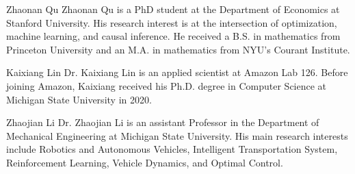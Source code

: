 \documentclass[journal]{IEEEtran}
\begin{document}

%









% 
\newpage

%




  
\newpage
\begin{IEEEbiography}{Zhaonan Qu}
Zhaonan Qu is a PhD student at the Department of Economics at Stanford University. His research interest is at the intersection of optimization, machine learning, and causal inference. He received a B.S. in mathematics from Princeton University and an M.A. in mathematics from NYU's Courant Institute.
\end{IEEEbiography}

\begin{IEEEbiography}{Kaixiang Lin}
Dr. Kaixiang Lin is an applied scientist at Amazon Lab 126. Before joining Amazon, 
Kaixiang received his Ph.D. degree in Computer Science at Michigan State University in 2020. 
\end{IEEEbiography}





\begin{IEEEbiography}{Zhaojian Li}
Dr. Zhaojian Li is an assistant Professor in the Department of Mechanical Engineering at Michigan State University. His main research interests include Robotics and Autonomous Vehicles, Intelligent Transportation System, Reinforcement Learning, Vehicle Dynamics, and Optimal Control.
\end{IEEEbiography}
\end{document}
